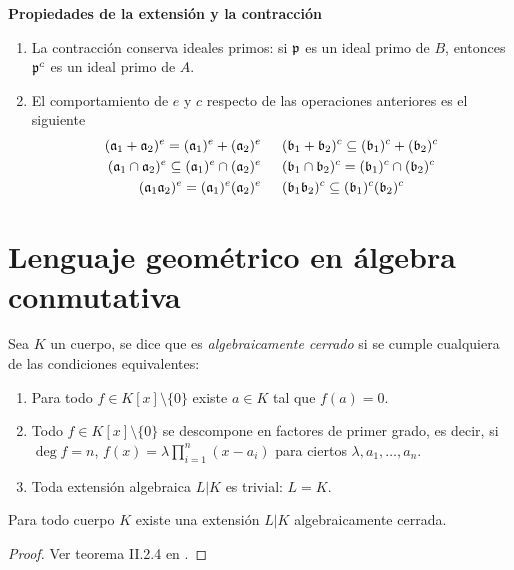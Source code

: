 \documentclass[./main.tex]{subfiles}
\begin{document}
\begin{remark} \textbf{Propiedades de la extensión y la contracción}

\begin{enumerate}
    \item La contracción conserva ideales primos: si $\mathfrak{p}$ es un ideal primo de $B$, entonces $\mathfrak{p}^c$ es un ideal primo de $A$.
    \item El comportamiento de $e$ y $c$ respecto de las operaciones anteriores es el siguiente\begin{align*}
        (\mathfrak{a}_1+\mathfrak{a}_2)^e=(\mathfrak{a}_1)^e+(\mathfrak{a}_2)^e\hspace{15pt}& (\mathfrak{b}_1+\mathfrak{b}_2)^c\subseteq(\mathfrak{b}_1)^c+(\mathfrak{b}_2)^c\\
        (\mathfrak{a}_1\cap\mathfrak{a}_2)^e\subseteq(\mathfrak{a}_1)^e\cap(\mathfrak{a}_2)^e\hspace{15pt}&(\mathfrak{b}_1\cap\mathfrak{b}_2)^c=(\mathfrak{b}_1)^c\cap(\mathfrak{b}_2)^c\\
        (\mathfrak{a}_1\mathfrak{a}_2)^e=(\mathfrak{a}_1)^e(\mathfrak{a}_2)^e\hspace{15pt}& (\mathfrak{b}_1\mathfrak{b}_2)^c\subseteq(\mathfrak{b}_1)^c(\mathfrak{b}_2)^c
    \end{align*}
\end{enumerate}
\end{remark}


\section{Lenguaje geométrico en álgebra conmutativa}

\begin{definition}
Sea $K$ un cuerpo, se dice que es \emph{algebraicamente cerrado} si se cumple cualquiera de las condiciones equivalentes:
\begin{enumerate}
    \item Para todo $f\in K[x]\setminus\{0\}$ existe $a\in K$ tal que $f(a)=0$.
    \item Todo $f\in K[x]\setminus\{0\}$ se descompone en factores de primer grado, es decir, si $\deg f = n$, $f(x) =\lambda \prod_{i=1}^n (x-a_i)$ para ciertos $\lambda, a_1, \dots, a_n$.
    \item Toda extensión algebraica $L\vert K$ es trivial: $L = K$.
\end{enumerate}
\end{definition}

\begin{proposition}
Para todo cuerpo $K$ existe una extensión $L|K$ algebraicamente cerrada.
\end{proposition}
\begin{proof}
Ver teorema II.2.4 en \cite{gamboa}.
\end{proof}
\end{document}
